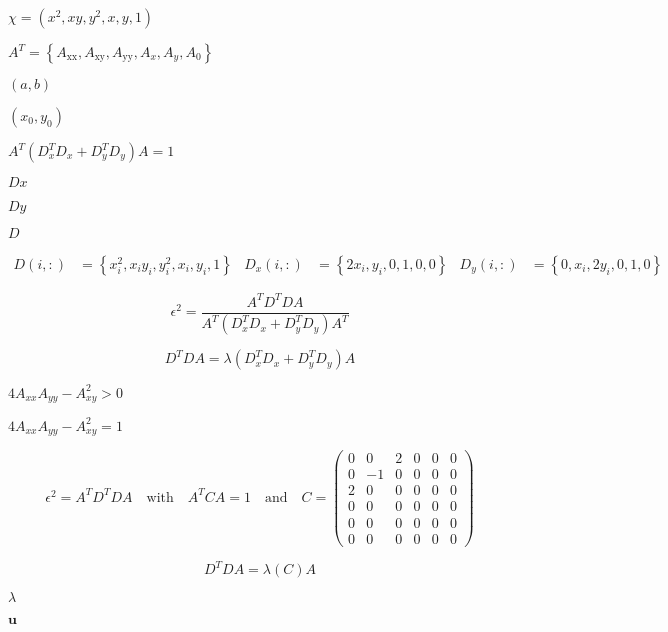 \documentclass{article}
\begin{document}
$ \chi= \left(x^2, x y, y^2, x, y, 1\right) $
\pagebreak

$ A^T=\left\{A_{\text{xx}},A_{\text{xy}},A_{\text{yy}},A_x,A_y,A_0\right\} $
\pagebreak

$ (a,b) $
\pagebreak

$ (x_0,y_0) $
\pagebreak

$ A^T ( D_x^T D_x + D_y^T D_y) A = 1 $
\pagebreak

$ Dx $
\pagebreak

$ Dy $
\pagebreak

$ D $
\pagebreak

\begin{align*} D(i,:)&=\left\{x_i^2, x_i y_i, y_i^2, x_i, y_i, 1\right\} & D_x(i,:)&=\left\{2 x_i,y_i,0,1,0,0\right\} & D_y(i,:)&=\left\{0,x_i,2 y_i,0,1,0\right\} \end{align*}
\pagebreak

\begin{equation*} \epsilon ^2=\frac{ A^T D^T D A }{ A^T (D_x^T D_x + D_y^T D_y) A^T } \end{equation*}
\pagebreak

\begin{equation*} D^T D A = \lambda \left( D_x^T D_x + D_y^T D_y\right) A \end{equation*}
\pagebreak

$ 4 A_{xx} A_{yy}- A_{xy}^2 > 0 $
\pagebreak

$ 4 A_{xx} A_{yy}- A_{xy}^2=1 $
\pagebreak

\begin{equation*} \epsilon ^2= A^T D^T D A \quad \text{with} \quad A^T C A =1 \quad \text{and} \quad C=\left(\begin{matrix} 0 & 0 & 2 & 0 & 0 & 0 \\ 0 & -1 & 0 & 0 & 0 & 0 \\ 2 & 0 & 0 & 0 & 0 & 0 \\ 0 & 0 & 0 & 0 & 0 & 0 \\ 0 & 0 & 0 & 0 & 0 & 0 \\ 0 & 0 & 0 & 0 & 0 & 0 \end{matrix} \right) \end{equation*}
\pagebreak

\begin{equation*} D^T D A = \lambda \left( C\right) A \end{equation*}
\pagebreak

$ \lambda$
\pagebreak

$\mathbf{u}$
\pagebreak
\end{document}
